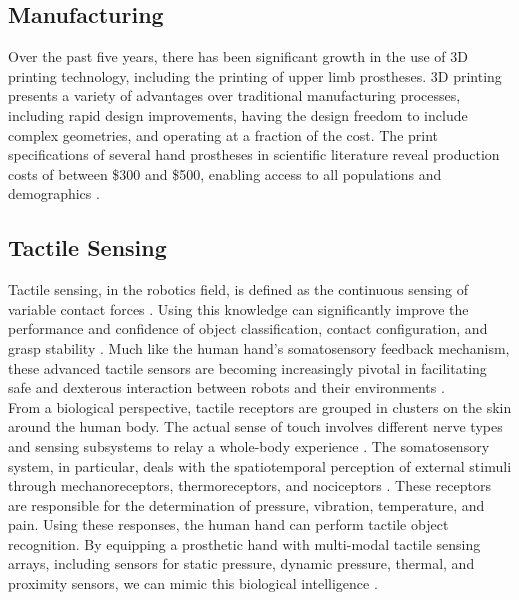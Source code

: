 \documentclass[11.5pt]{article}
\begin{document}
\subsection{Manufacturing}

Over the past five years, there has been significant growth in the use of 3D printing technology, including the printing of upper limb prostheses. 3D printing presents a variety of advantages over traditional manufacturing processes, including rapid design improvements, having the design freedom to include complex geometries, and operating at a fraction of the cost. The print specifications of several hand prostheses in scientific literature reveal production costs of between \$300 and \$500, enabling access to all populations and demographics \cite{Ten_Kate2017-sf}.

\subsection{Tactile Sensing}

Tactile sensing, in the robotics field, is defined as the continuous sensing of variable contact forces \cite{Pennywitt1986-ww}. Using this knowledge can significantly improve the performance and confidence of object classification, contact configuration, and grasp stability \cite{Schiefer2018-tt}. Much like the human hand's somatosensory feedback mechanism, these advanced tactile sensors are becoming increasingly pivotal in facilitating safe and dexterous interaction between robots and their environments \cite{Schiefer2018-tt, Charalambides2017-vy}. \\ 

From a biological perspective, tactile receptors are grouped in clusters on the skin around the human body. The actual sense of touch involves different nerve types and sensing subsystems to relay a whole-body experience \cite{Dargahi2004-tv}. The somatosensory system, in particular, deals with the spatiotemporal perception of external stimuli through mechanoreceptors, thermoreceptors, and nociceptors \cite{Dargahi2004-tv}. These receptors are responsible for the determination of pressure, vibration, temperature, and pain. Using these responses, the human hand can perform tactile object recognition. By equipping a prosthetic hand with multi-modal tactile sensing arrays, including sensors for static pressure, dynamic pressure, thermal, and proximity sensors, we can mimic this biological intelligence \cite{Dargahi2004-tv}. \\
\end{document}
